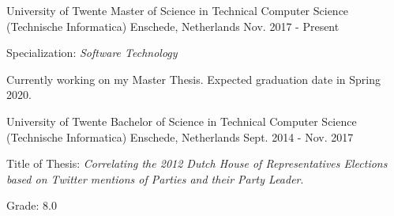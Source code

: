 
\begin{cventries}

\cventry
{University of Twente} %
{Master of Science in Technical Computer Science (Technische Informatica)} %
{Enschede, Netherlands} %
{Nov. 2017 - Present} %
{
	\begin{cvitems} %
		\item Specialization: \textit{Software Technology}
		\item Currently working on my Master Thesis. Expected graduation date in Spring 2020.
	\end{cvitems}
}

\cventry
{University of Twente} %
{Bachelor of Science in Technical Computer Science (Technische Informatica)} %
{Enschede, Netherlands} %
{Sept. 2014 - Nov. 2017} %
{
  \begin{cvitems} %
    \item {Title of Thesis: \textit{Correlating the 2012 Dutch House of Representatives Elections based on Twitter mentions of Parties and their Party Leader}.}
    \item Grade: 8.0
  \end{cvitems}
}
\end{cventries}
